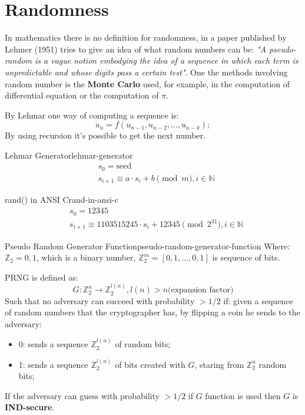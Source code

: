 \documentclass[12pt]{article}
\begin{document}
\section{Randomness}
In mathematics there is no definition for randomness, in a paper published by Lehmer (1951) tries to give an idea of what random numbers can be: \emph{"A pseudo-random is a vague notion embodying the idea of a sequence in which each term is unpredictable and whose digits pass a certain test"}. One the methods involving random number is the \textbf{Monte Carlo} used, for example, in the computation of differential equation or the computation of $\pi$.

By Lehmar one way of computing a sequence is:
\[ u_n = f(u_{n-1}, u_{n-2}, \dots, u_{n-k}); \]
By using recursion it's possible to get the next number.
\begin{definition}{Lehmar Generator}{lehmar-generator}
  \begin{align*}
    & s_0 = \text{seed} \\
    & s_{i+1} \equiv a \cdot s_i + b \pmod{m}, i \in \mathbb{N}
  \end{align*}
\end{definition}
\begin{example}{rand() in ANSI C}{rand-in-ansi-c}
  \begin{align*}
    & s_0 = 12345 \\
    & s_{i+1} \equiv 1103515245 \cdot s_i + 12345 \pmod{2^{31}}, i \in \mathbb{N}
  \end{align*}
\end{example}
\begin{definition}{Pseudo Random Generator Function}{pseudo-random-generator-function}
  Where: $\mathbb{Z}_2 = {0, 1}$, which is a binary number, $\mathbb{Z}_2^{m} = [{0,1},\dots,{0,1}]$ is sequence of bits.

  PRNG is defined as:
  \[ G: \mathbb{Z}_2^{n} \rightarrow  \mathbb{Z}_2^{l(n)}, l(n) > n \text{(expansion factor)} \]
  Such that no adversary can succeed with probability $> 1/2$ if: given a sequence of random numbers that the cryptographer has, by flipping a coin he sends to the adversary:
  \begin{itemize}
    \item 0: sends a sequence $\mathbb{Z}_2^{l(n)}$ of random bits;
    \item 1: sends a sequence $\mathbb{Z}_2^{l(n)}$ of bits created with $G$, staring from $\mathbb{Z}_2^{n}$ random bits;
  \end{itemize}
  If the adversary can guess with probability $> 1/2$ if $G$ function is used then $G$ is \textbf{IND-secure}.
\end{definition}
\end{document}
